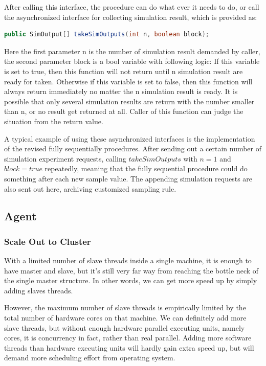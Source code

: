 After calling this interface, the procedure can do what ever it needs to do, or call the asynchronized interface for collecting simulation result, which is provided as:

\begin{lstlisting}[language=Java]
public SimOutput[] takeSimOutputs(int n, boolean block);
\end{lstlisting}

Here the first parameter n is the number of simulation result demanded by caller, the second parameter block is a bool variable with following logic: If this variable is set to true, then this function will not return until n simulation result are ready for taken. Otherwise if this variable  is set to false, then this function will always return immediately no matter the n simulation result is ready. It is possible that only several simulation results are return with the number smaller than n, or no result get returned at all. Caller of this function can judge the situation from the return value.

A typical example of using these asynchronized interfaces is the implementation of the revised fully sequentially procedures. After sending out a certain number of simulation experiment requests, calling $takeSimOutputs$ with $n = 1$ and $block = true$ repeatedly, meaning that the fully sequential procedure could do something after each new sample value. The appending simulation requests are also sent out here, archiving customized sampling rule.

\subsection{Agent}

\subsubsection{Scale Out to Cluster}

With a limited number of slave threads inside a single machine, it is enough to have master and slave, but it's still very far way from reaching the bottle neck of the single master structure. In other words, we can get more speed up by simply adding slaves threads.

However, the maximum number of slave threads is empirically limited by the total number of hardware cores on that machine. We can definitely add more slave threads, but without enough hardware parallel executing units, namely cores, it is concurrency in fact, rather than real parallel. Adding more software threads than hardware executing units will hardly gain extra speed up, but will demand more scheduling effort from operating system.

